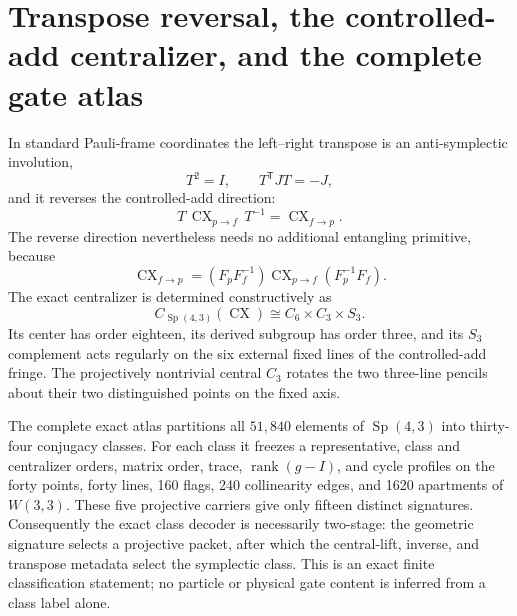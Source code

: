 \providecommand{\Sp}{\operatorname{Sp}}
\section*{Transpose reversal, the controlled-add centralizer, and the complete gate atlas}
In standard Pauli-frame coordinates the left--right transpose is an
anti-symplectic involution,
\[
 T^2=I,\qquad T^{\mathsf T}JT=-J,
\]
and it reverses the controlled-add direction:
\[
 T\,\operatorname{CX}_{p\to f}\,T^{-1}=\operatorname{CX}_{f\to p}.
\]
The reverse direction nevertheless needs no additional entangling primitive, because
\[
 \operatorname{CX}_{f\to p}
 =(F_pF_f^{-1})\operatorname{CX}_{p\to f}(F_p^{-1}F_f).
\]
The exact centralizer is determined constructively as
\[
 C_{\Sp(4,3)}(\operatorname{CX})\cong C_6\times C_3\times S_3.
\]
Its center has order eighteen, its derived subgroup has order three, and its
\(S_3\) complement acts regularly on the six external fixed lines of the controlled-add
fringe.  The projectively nontrivial central \(C_3\) rotates the two three-line pencils
about their two distinguished points on the fixed axis.

The complete exact atlas partitions all \(51{,}840\) elements of \(\Sp(4,3)\) into
thirty-four conjugacy classes.  For each class it freezes a representative, class and
centralizer orders, matrix order, trace, \(\operatorname{rank}(g-I)\), and cycle profiles
on the forty points, forty lines, 160 flags, 240 collinearity edges, and 1620 apartments
of \(W(3,3)\).  These five projective carriers give only fifteen distinct signatures.
Consequently the exact class decoder is necessarily two-stage: the geometric signature
selects a projective packet, after which the central-lift, inverse, and transpose metadata
select the symplectic class.  This is an exact finite classification statement; no
particle or physical gate content is inferred from a class label alone.

